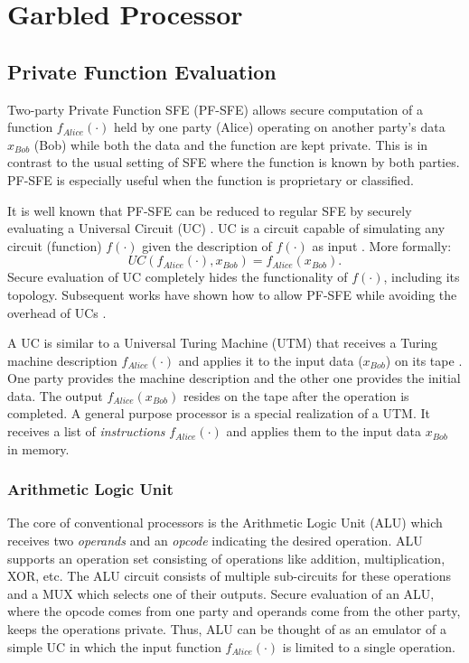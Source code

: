 \chapter{Garbled Processor}
\section{Private Function Evaluation}
Two-party Private Function SFE (PF-SFE) allows secure computation of a function $f_{Alice}(\cdot)$ held by one party (Alice) operating on another party's data $x_{Bob}$ (Bob) while both the data and the function are kept private.
This is in contrast to the usual setting of SFE where the function is known by both parties.
PF-SFE is especially useful when the function is proprietary or classified.

It is well known that PF-SFE can be reduced to regular SFE by securely evaluating a Universal Circuit (UC) \cite{sander1999non}.
UC is a circuit capable of simulating any circuit (function) $f(\cdot)$ given the description of $f(\cdot)$ as input \cite{valiant1976universal,kolesnikov2008practical}.
More formally:
$$UC(f_{Alice}(\cdot),x_{Bob}) = f_{Alice}(x_{Bob}).$$
Secure evaluation of UC completely hides the functionality of $f(\cdot)$, including its topology.
Subsequent works have shown how to allow PF-SFE while avoiding the overhead of UCs \cite{katz2011constant, mohassel2013hide}.

A UC is similar to a Universal Turing Machine (UTM) \cite{turing1936computable,herken1995universal} that receives a Turing machine description $f_{Alice}(\cdot)$ and applies it to the input data ($x_{Bob}$) on its tape \cite{davis2001engines}.
One party provides the machine description and the other one provides the initial data.
The output $f_{Alice}(x_{Bob})$ resides on the tape after the operation is completed.
A general purpose processor is a special realization of a UTM.
It receives a list of \emph{instructions} $f_{Alice}(\cdot)$ and applies them to the input data $x_{Bob}$ in memory.

\subsection{Arithmetic Logic Unit}
The core of conventional processors is the Arithmetic Logic Unit (ALU) which receives two \emph{operands} and an \emph{opcode} indicating the desired operation.
ALU supports an operation set consisting of operations like addition, multiplication, XOR, etc.
The ALU circuit consists of multiple sub-circuits for these operations and a MUX which selects one of their outputs.
Secure evaluation of an ALU, where the opcode comes from one party and operands come from the other party, keeps the operations private.
Thus, ALU can be thought of as an emulator of a simple UC in which the input function $f_{Alice}(\cdot)$ is limited to a single operation.

